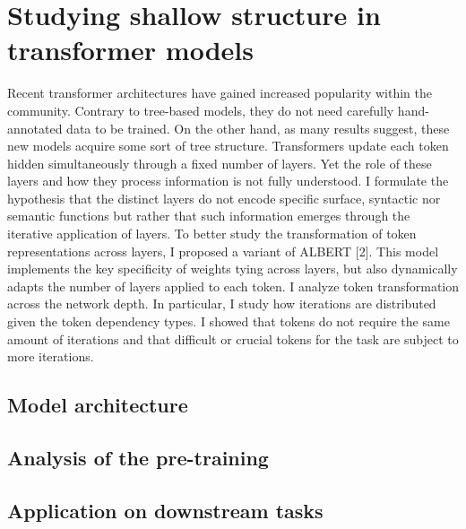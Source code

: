 \setchapterpreamble[u]{\margintoc}
\chapter{Studying shallow structure in transformer models}

Recent transformer architectures have gained increased popularity within the community. Contrary to tree-based models, they do not need carefully hand-annotated data to be trained. On the other hand, as many results suggest, these new models acquire some sort of tree structure. Transformers update each token hidden simultaneously through a fixed number of layers. Yet the role of these layers and how they process information is not fully understood. I formulate the hypothesis that the distinct layers do not encode specific surface, syntactic nor semantic functions but rather that such information emerges through the iterative application of layers. To better study the transformation of token representations across layers, I proposed a variant of ALBERT [2]. This model implements the key specificity of weights tying across layers, but also dynamically adapts the number of layers applied to each token. I analyze token transformation across the network depth. In particular, I study how iterations are distributed given the token dependency types. I showed that tokens do not require the same amount of iterations and that difficult or crucial tokens for the task are subject to more iterations.

\section{Model architecture}

\section{Analysis of the pre-training}

\section{Application on downstream tasks}
